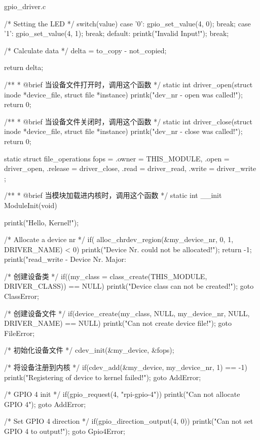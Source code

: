 \documentclass[lang=cn,newtx,10pt,scheme=chinese]{elegantbook}
\begin{document}
\begin{mycode}{gpio\_driver.c}
{    /* Setting the LED */
    switch(value) {
        case '0':
            gpio_set_value(4, 0);
            break;
        case '1':
            gpio_set_value(4, 1);
            break;
        default:
            printk("Invalid Input!\n");
            break;
    }

    /* Calculate data */
    delta = to_copy - not_copied;

    return delta;
}

/**
 * @brief 当设备文件打开时，调用这个函数
 */
static int driver_open(struct inode *device_file, struct file *instance) {
    printk("dev_nr - open was called!\n");
    return 0;
}

/**
 * @brief 当设备文件关闭时，调用这个函数
 */
static int driver_close(struct inode *device_file, struct file *instance) {
    printk("dev_nr - close was called!\n");
    return 0;
}

static struct file_operations fops = {
    .owner = THIS_MODULE,
    .open = driver_open,
    .release = driver_close,
    .read = driver_read,
    .write = driver_write
};

/**
 * @brief 当模块加载进内核时，调用这个函数
 */
static int __init ModuleInit(void) {
    printk("Hello, Kernel!\n");

    /* Allocate a device nr */
    if( alloc_chrdev_region(&my_device_nr, 0, 1, DRIVER_NAME) < 0) {
        printk("Device Nr. could not be allocated!\n");
        return -1;
    }
    printk("read_write - Device Nr. Major: %

    /* 创建设备类 */
    if((my_class = class_create(THIS_MODULE, DRIVER_CLASS)) == NULL) {
        printk("Device class can not be created!\n");
        goto ClassError;
    }

    /* 创建设备文件 */
    if(device_create(my_class, NULL, my_device_nr, NULL, DRIVER_NAME) == NULL) {
        printk("Can not create device file!\n");
        goto FileError;
    }

    /* 初始化设备文件 */
    cdev_init(&my_device, &fops);

    /* 将设备注册到内核 */
    if(cdev_add(&my_device, my_device_nr, 1) == -1) {
        printk("Registering of device to kernel failed!\n");
        goto AddError;
    }

    /* GPIO 4 init */
    if(gpio_request(4, "rpi-gpio-4")) {
        printk("Can not allocate GPIO 4\n");
        goto AddError;
    }

    /* Set GPIO 4 direction */
    if(gpio_direction_output(4, 0)) {
        printk("Can not set GPIO 4 to output!\n");
        goto Gpio4Error;
    }

}
\end{mycode}
\end{document}
